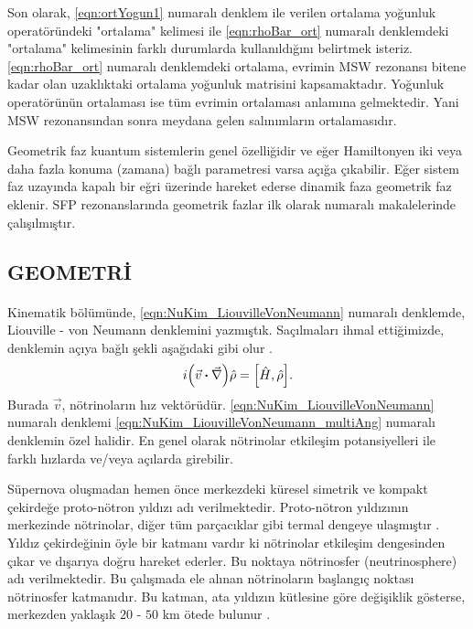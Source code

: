 Son olarak, \eqref{eqn:ortYogun1} numaralı denklem ile verilen ortalama yoğunluk operatöründeki "ortalama" kelimesi ile \eqref{eqn:rhoBar_ort} numaralı denklemdeki "ortalama" kelimesinin farklı durumlarda kullanıldığını belirtmek isteriz. \eqref{eqn:rhoBar_ort} numaralı denklemdeki ortalama, evrimin MSW rezonansı bitene kadar olan uzaklıktaki ortalama yoğunluk matrisini kapsamaktadır. Yoğunluk operatörünün ortalaması ise tüm evrimin ortalaması anlamına gelmektedir. Yani MSW rezonansından sonra meydana gelen salınımların ortalamasıdır.

Geometrik faz kuantum sistemlerin genel özelliğidir ve eğer Hamiltonyen iki veya daha fazla konuma (zamana) bağlı parametresi varsa açığa çıkabilir. Eğer sistem faz uzayında kapalı bir eğri üzerinde hareket ederse dinamik faza geometrik faz eklenir. SFP rezonanslarında geometrik fazlar ilk olarak \cite{Vidal:1990fr, Smirnov:1991ia, Akhmedov:1991vj} numaralı makalelerinde çalışılmıştır. 

\subsection{GEOMETRİ}\label{subsec:geometri}
\paragraph{}
Kinematik bölümünde, \eqref{eqn:NuKim_LiouvilleVonNeumann} numaralı denklemde, Liouville - von Neumann denklemini yazmıştık. Saçılmaları ihmal ettiğimizde, denklemin açıya bağlı şekli aşağıdaki gibi olur \cite{Duan:2006an, Mirizzi:2015fva}.
\begin{align}\label{eqn:NuKim_LiouvilleVonNeumann_multiAng}
	 i \qty(\vec{v} \vdot \vec{\nabla}) \hat{\rho} = \comm{\hat{H}}{\hat{\rho}} \text{.}
\end{align}
Burada $ \vec{v} $, nötrinoların hız vektörüdür. \eqref{eqn:NuKim_LiouvilleVonNeumann} numaralı denklemi \eqref{eqn:NuKim_LiouvilleVonNeumann_multiAng} numaralı denklemin özel halidir. En genel olarak nötrinolar etkileşim potansiyelleri ile farklı hızlarda ve/veya açılarda girebilir.

Süpernova oluşmadan hemen önce merkezdeki küresel simetrik ve kompakt çekirdeğe proto-nötron yıldızı adı verilmektedir. Proto-nötron yıldızının merkezinde nötrinolar, diğer tüm parçacıklar gibi termal dengeye ulaşmıştır \cite{Janka:2006fh}. Yıldız çekirdeğinin öyle bir katmanı vardır ki nötrinolar etkileşim dengesinden çıkar ve dışarıya doğru hareket ederler. Bu noktaya nötrinosfer (neutrinosphere) adı verilmektedir. Bu çalışmada ele alınan nötrinoların başlangıç noktası nötrinosfer katmanıdır. Bu katman, ata yıldızın kütlesine göre değişiklik gösterse, merkezden yaklaşık $20$ - $50$ km ötede bulunur \cite{Janka:2006fh, Dasgupta:2008cd}.

